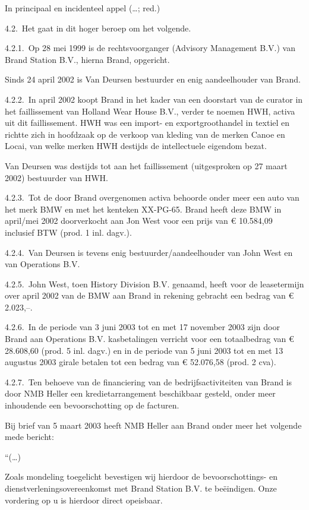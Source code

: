 \documentclass[
  dutch,
  a4paper,
]{article}
\begin{document}
In principaal en incidenteel appel
(\ldots; red.)

4.2. Het gaat in dit hoger beroep om het volgende.

4.2.1. Op 28 mei 1999 is de rechtsvoorganger (Advisory Management B.V.) van Brand Station B.V., hierna Brand, opgericht.

Sinds 24 april 2002 is Van Deursen bestuurder en enig aandeelhouder van Brand.

4.2.2. In april 2002 koopt Brand in het kader van een doorstart van de curator in het faillissement van Holland Wear House B.V., verder te noemen HWH, activa uit dit faillissement. HWH was een import- en exportgroothandel in textiel en richtte zich in hoofdzaak op de verkoop van kleding van de merken Canoe en Locai, van welke merken HWH destijds de intellectuele eigendom bezat.

Van Deursen was destijds tot aan het faillissement (uitgesproken op 27 maart 2002) bestuurder van HWH.

4.2.3. Tot de door Brand overgenomen activa behoorde onder meer een auto van het merk BMW en met het kenteken XX-PG-65. Brand heeft deze BMW in april/mei 2002 doorverkocht aan Jon West voor een prijs van € 10.584,09 inclusief BTW (prod. 1 inl. dagv.).

4.2.4. Van Deursen is tevens enig bestuurder/aandeelhouder van John West en van Operations B.V.

4.2.5. John West, toen History Division B.V. genaamd, heeft voor de leasetermijn over april 2002 van de BMW aan Brand in rekening gebracht een bedrag van € 2.023,--.

4.2.6. In de periode van 3 juni 2003 tot en met 17 november 2003 zijn door Brand aan Operations B.V. kasbetalingen verricht voor een totaalbedrag van € 28.608,60 (prod. 5 inl. dagv.) en in de periode van 5 juni 2003 tot en met 13 augustus 2003 girale betalen tot een bedrag van € 52.076,58 (prod. 2 cva).

4.2.7. Ten behoeve van de financiering van de bedrijfsactiviteiten van Brand is door NMB Heller een kredietarrangement beschikbaar gesteld, onder meer inhoudende een bevoorschotting op de facturen.

Bij brief van 5 maart 2003 heeft NMB Heller aan Brand onder meer het volgende mede bericht:

``(\ldots)

Zoals mondeling toegelicht bevestigen wij hierdoor de bevoorschottings- en dienstverleningsovereenkomst met Brand Station B.V. te beëindigen. Onze vordering op u is hierdoor direct opeisbaar.
\end{document}
